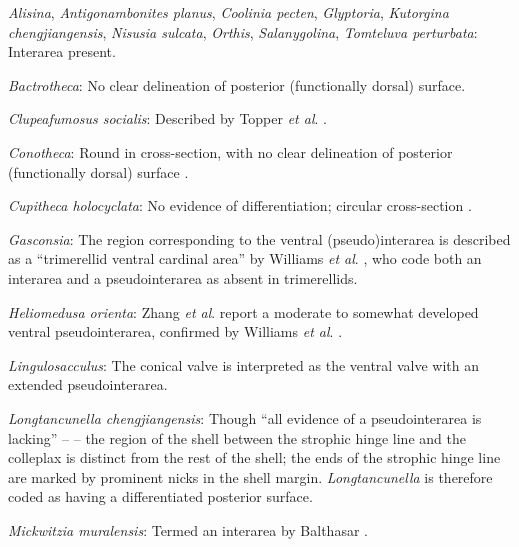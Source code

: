 \documentclass[openany]{book}
\begin{document}
\hypertarget{Alisina-coding-106}{}
\emph{Alisina}, \emph{Antigonambonites planus}, \emph{Coolinia pecten},
\emph{Glyptoria}, \emph{Kutorgina chengjiangensis}, \emph{Nisusia
sulcata}, \emph{Orthis}, \emph{Salanygolina}, \emph{Tomteluva
perturbata}: Interarea present.

\hypertarget{Bactrotheca-coding-106}{}
\emph{Bactrotheca}: No clear delineation of posterior (functionally
dorsal) surface.

\hypertarget{Clupeafumosus_socialis-coding-106}{}
\emph{Clupeafumosus socialis}: Described by Topper \emph{et al}.
\citeyearpar{Topper2013Reappraisalof}.

\hypertarget{Conotheca-coding-106}{}
\emph{Conotheca}: Round in cross-section, with no clear delineation of
posterior (functionally dorsal) surface \citep{Devaere2014}.

\hypertarget{Cupitheca_holocyclata-coding-106}{}
\emph{Cupitheca holocyclata}: No evidence of differentiation; circular
cross-section \citep{Vendrasco2017}.

\hypertarget{Gasconsia-coding-106}{}
\emph{Gasconsia}: The region corresponding to the ventral
(pseudo)interarea is described as a ``trimerellid ventral cardinal
area'' by Williams \emph{et al}.
\citeyearpar[p.162]{Williams2000LinguliformeaCraniiformea}, who code
both an interarea and a pseudointerarea as absent in trimerellids.

\hypertarget{Heliomedusa_orienta-coding-106}{}
\emph{Heliomedusa orienta}: Zhang \emph{et al}.
\citeyearpar{Zhang2009Architectureand} report a moderate to somewhat
developed ventral pseudointerarea, confirmed by Williams \emph{et al}.
\citeyearpar{Williams2007Supplement}.

\hypertarget{Lingulosacculus-coding-106}{}
\emph{Lingulosacculus}: The conical valve is interpreted as the ventral
valve with an extended pseudointerarea.

\hypertarget{Longtancunella_chengjiangensis-coding-106}{}
\emph{Longtancunella chengjiangensis}: Though ``all evidence of a
pseudointerarea is lacking'' -- \citet{Zhang2011Theexceptionally} -- the
region of the shell between the strophic hinge line and the colleplax
\citep[fig. 2 in][]{Zhang2011Theexceptionally} is distinct from the rest
of the shell; the ends of the strophic hinge line are marked by
prominent nicks in the shell margin. \emph{Longtancunella} is therefore
coded as having a differentiated posterior surface.

\hypertarget{Mickwitzia_muralensis-coding-106}{}
\emph{Mickwitzia muralensis}: Termed an interarea by Balthasar
\citeyearpar{Balthasar2004Shellstructure}.
\end{document}
